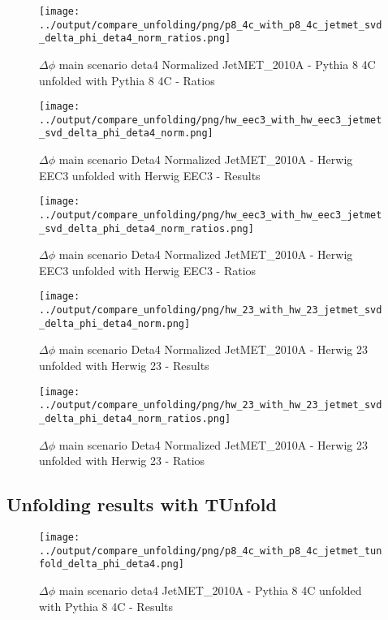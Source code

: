 \documentclass[11pt]{book}
\begin{document}
\begin{figure}[ht]
\centering
\texttt{[image: ../output/compare\_unfolding/png/p8\_4c\_with\_p8\_4c\_jetmet\_svd\_delta\_phi\_deta4\_norm\_ratios.png]}
\caption{$\Delta\phi$ main scenario deta4 Normalized JetMET\_2010A - Pythia 8 4C unfolded with Pythia 8 4C - Ratios}
\label{p8_p8_jetmet_svd_delta_phi_deta4_norm_b}
\end{figure}

\begin{figure}[ht]
\centering
\texttt{[image: ../output/compare\_unfolding/png/hw\_eec3\_with\_hw\_eec3\_jetmet\_svd\_delta\_phi\_deta4\_norm.png]}
\caption{$\Delta\phi$ main scenario Deta4 Normalized JetMET\_2010A - Herwig EEC3 unfolded with Herwig EEC3 - Results}
\label{hw_eec3_hw_eec3_jetmet_svd_delta_phi_deta4_norm_a}
\end{figure}

\begin{figure}[ht]
\centering
\texttt{[image: ../output/compare\_unfolding/png/hw\_eec3\_with\_hw\_eec3\_jetmet\_svd\_delta\_phi\_deta4\_norm\_ratios.png]}
\caption{$\Delta\phi$ main scenario Deta4 Normalized JetMET\_2010A - Herwig EEC3 unfolded with Herwig EEC3 - Ratios}
\label{hw_eec3_hw_eec3_jetmet_svd_delta_phi_deta4_norm_b}
\end{figure}

\begin{figure}[ht]
\centering
\texttt{[image: ../output/compare\_unfolding/png/hw\_23\_with\_hw\_23\_jetmet\_svd\_delta\_phi\_deta4\_norm.png]}
\caption{$\Delta\phi$ main scenario Deta4 Normalized JetMET\_2010A - Herwig 23 unfolded with Herwig 23 - Results}
\label{hw_23_hw_23_jetmet_svd_delta_phi_deta4_norm_a}
\end{figure}

\begin{figure}[ht]
\centering
\texttt{[image: ../output/compare\_unfolding/png/hw\_23\_with\_hw\_23\_jetmet\_svd\_delta\_phi\_deta4\_norm\_ratios.png]}
\caption{$\Delta\phi$ main scenario Deta4 Normalized JetMET\_2010A - Herwig 23 unfolded with Herwig 23 - Ratios}
\label{hw_23_hw_23_jetmet_svd_delta_phi_deta4_norm_b}
\end{figure}


\clearpage
\subsection{Unfolding results with TUnfold}

\begin{figure}[ht]
\centering
\texttt{[image: ../output/compare\_unfolding/png/p8\_4c\_with\_p8\_4c\_jetmet\_tunfold\_delta\_phi\_deta4.png]}
\caption{$\Delta\phi$ main scenario deta4 JetMET\_2010A - Pythia 8 4C unfolded with Pythia 8 4C - Results}
\label{p8_p8_jetmet_tunfold_delta_phi_deta4_a}
\end{figure}
\end{document}
